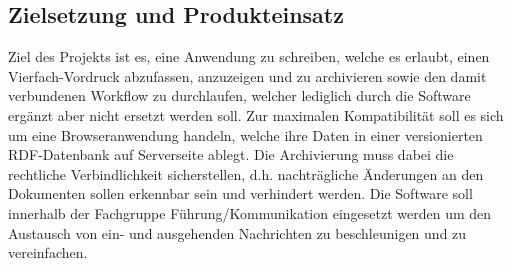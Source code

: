 \subsection{Zielsetzung und Produkteinsatz}
Ziel des Projekts ist es, eine Anwendung zu schreiben, welche es erlaubt, einen Vierfach-Vordruck
abzufassen, anzuzeigen und zu archivieren sowie den damit verbundenen Workflow zu durchlaufen, 
welcher lediglich durch die Software ergänzt aber nicht ersetzt werden soll. 
Zur maximalen Kompatibilität soll es sich um eine Browseranwendung handeln, welche ihre Daten in
einer versionierten RDF-Datenbank auf Serverseite ablegt. 
Die Archivierung muss dabei die rechtliche Verbindlichkeit sicherstellen, d.h. nachträgliche
Änderungen an den Dokumenten sollen erkennbar sein und verhindert werden.
Die Software soll innerhalb der Fachgruppe Führung/Kommunikation eingesetzt werden um den Austausch 
von ein- und ausgehenden Nachrichten zu beschleunigen und zu vereinfachen.
